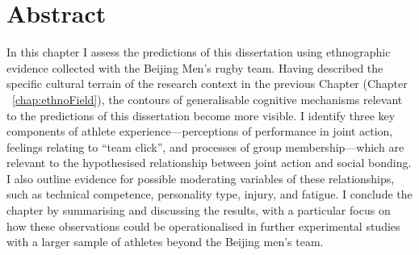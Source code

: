 
\chapter*{Abstract}





In this chapter I assess the predictions of this dissertation using ethnographic evidence collected with the Beijing Men's rugby team.  Having described the specific cultural terrain of the research context in the previous Chapter (Chapter ~\ref{chap:ethnoField}), the contours of generalisable cognitive mechanisms relevant to the predictions of this dissertation become more visible. I identify three key components of athlete experience---perceptions of performance in joint action, feelings relating to ``team click'', and processes of group membership---which are relevant to the hypothesised relationship between joint action and social bonding.  I also outline evidence for possible moderating variables of these relationships, such as technical competence, personality type, injury, and fatigue.  I conclude the chapter by summarising and discussing the results, with a particular focus on how these observations could be operationalised in further experimental studies with a larger sample of athletes beyond the Beijing men's team.
